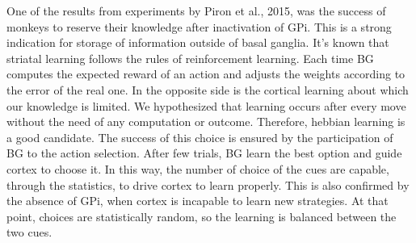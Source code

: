 	One of the results from experiments by Piron et al., 2015, was the success of monkeys to reserve their knowledge after inactivation of GPi. This is a strong indication for storage of information outside of basal ganglia. It's known that striatal learning follows the rules of reinforcement learning. Each time BG computes the expected reward of an action and adjusts the weights according to the error of the real one. In the opposite side is the cortical learning about which our knowledge is limited. We hypothesized that learning occurs after every move without the need of any computation or outcome. Therefore, hebbian learning is a good candidate. The success of this choice is ensured by the participation of BG to the action selection. After few trials, BG learn the best option and guide cortex to choose it. In this way, the number of choice of the cues are capable, through the statistics, to drive cortex to learn properly. This is also confirmed by the absence of GPi, when cortex is incapable to learn new strategies. At that point, choices are statistically random, so the learning is balanced between the two cues. 